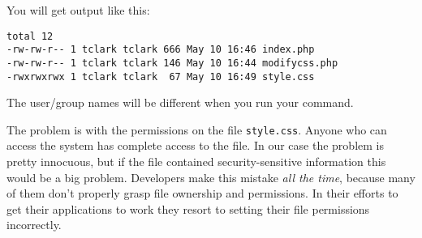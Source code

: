 \documentclass{article}
\begin{document}
You will get output like this:

\begin{verbatim}
total 12
-rw-rw-r-- 1 tclark tclark 666 May 10 16:46 index.php
-rw-rw-r-- 1 tclark tclark 146 May 10 16:44 modifycss.php
-rwxrwxrwx 1 tclark tclark  67 May 10 16:49 style.css
\end{verbatim}

The user/group names will be different when you run your command.

The problem is with the permissions on the file \texttt{style.css}.  Anyone who can access the system has complete access to the file.  In our case the problem is pretty innocuous, but if the file contained security-sensitive information this would be a big problem.  Developers make this mistake \emph{all the time}, because many of them don't properly grasp file ownership and permissions.  In their efforts to get their applications to work they resort to setting their file permissions incorrectly.
\end{document}
